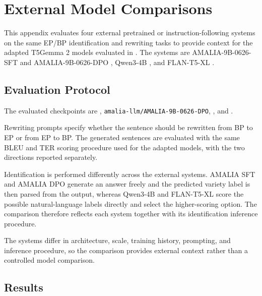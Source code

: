 \chapter{External Model Comparisons}
\label{chap:appendix-external-model-comparison}

This appendix evaluates four external pretrained or instruction-following
systems on the same EP/BP identification and rewriting tasks to provide
context for the adapted T5Gemma 2 models evaluated in .
The systems are
AMALIA-9B-0626-SFT and AMALIA-9B-0626-DPO
\citep{simplicio-etal-2026-amalia}, Qwen3-4B
\citep{yang2025qwen3technicalreport}, and FLAN-T5-XL
\citep{chung2022scalinginstructionfinetunedlanguagemodels}.

\section{Evaluation Protocol}

The evaluated checkpoints are ,
\texttt{amalia-\allowbreak{}llm/\allowbreak{}AMALIA-\allowbreak{}9B-\allowbreak{}0626-\allowbreak{}DPO}, , and
.

Rewriting prompts specify whether the sentence should be rewritten from BP to
EP or from EP to BP. The generated sentences are evaluated with the same BLEU
and TER scoring procedure used for the adapted models, with the two directions
reported separately.

Identification is performed differently across the external systems. AMALIA SFT
and AMALIA DPO generate an answer freely and the predicted variety label is
then parsed from the output, whereas Qwen3-4B and FLAN-T5-XL score the possible
natural-language labels directly and select the higher-scoring option. The
comparison therefore reflects each system together with its identification
inference procedure.

The systems differ in architecture, scale, training history, prompting, and
inference procedure, so the comparison provides external context rather than a
controlled model comparison.

\section{Results}

